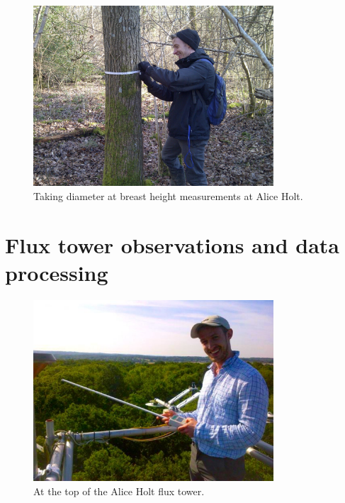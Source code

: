 \documentclass[11pt]{article}
\begin{document}
\begin{figure}[ht]
    \centering
    \includegraphics[width=0.8\textwidth]{dbh_me.pdf}
    \caption{Taking diameter at breast height measurements at Alice Holt.} \label{fig:dbh_me}
\end{figure}

\section{Flux tower observations and data processing}

\begin{figure}[ht]
    \centering
    \includegraphics[width=0.8\textwidth]{top_of_flux.pdf}
    \caption{At the top of the Alice Holt flux tower.} \label{fig:flux_me}
\end{figure}

{}
\end{document}
